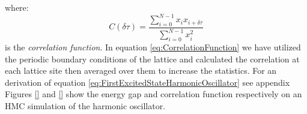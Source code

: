 \documentclass[12pt]{article}
\begin{document}
                where:
                \begin{equation}
                    \label{eq:CorrelationFunction}
                    C\left(\delta\tau\right) = \frac{\sum_{i=0}^{N-1} x_{i}x_{i+\delta\tau}}{\sum_{i=0}^{N-1}x_i^2}
                \end{equation}
                is the \textit{correlation function}. In equation \ref{eq:CorrelationFunction} we have utilized the periodic boundary conditions of the lattice and calculated the correlation at each lattice site then averaged over them to increase the statistics. For an derivation of equation \ref{eq:FirstExcitedStateHarmonicOscillator} see appendix 
                Figures \ref{} and \ref{} show the energy gap and correlation function respectively on an HMC simulation of the harmonic oscillator.
\end{document}
